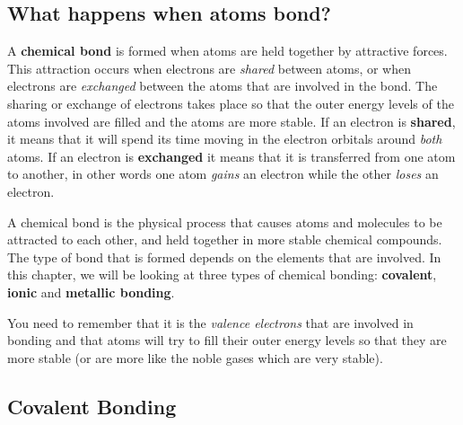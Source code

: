             \subsection{ What happens when atoms bond?}
            \nopagebreak
      \label{m38704*id138842}A \textbf{chemical bond} is formed when atoms are held together by attractive forces. This attraction occurs when electrons are \textsl{shared} between atoms, or when electrons are \textsl{exchanged} between the atoms that are involved in the bond. The sharing or exchange of electrons takes place so that the outer energy levels of the atoms involved are filled and the atoms are more stable. If an electron is \textbf{shared}, it means that it will spend its time moving in the electron orbitals around \textsl{both} atoms. If an electron is \textbf{exchanged} it means that it is transferred from one atom to another, in other words one atom \textsl{gains} an electron while the other \textsl{loses} an electron.\par 
\label{m38704*fhsst!!!underscore!!!id83}
 {\label{m38704*meaningfhsst!!!underscore!!!id83} A chemical bond is the physical process that causes atoms and molecules to be attracted to each other, and held together in more stable chemical compounds.} 
      \label{m38704*id138909}The type of bond that is formed depends on the elements that are involved. In this chapter, we will be looking at three types of chemical bonding: \textbf{covalent}, \textbf{ionic} and \textbf{metallic bonding}.\par 
      \label{m38704*id138929}You need to remember that it is the \textsl{valence electrons} that are involved in bonding and that atoms will try to fill their outer energy levels so that they are more stable (or are more like the noble gases which are very stable).\par 
    \label{m38704*cid5}
            \subsection{ Covalent Bonding}
            \nopagebreak
            \label{m38704*uid6}
